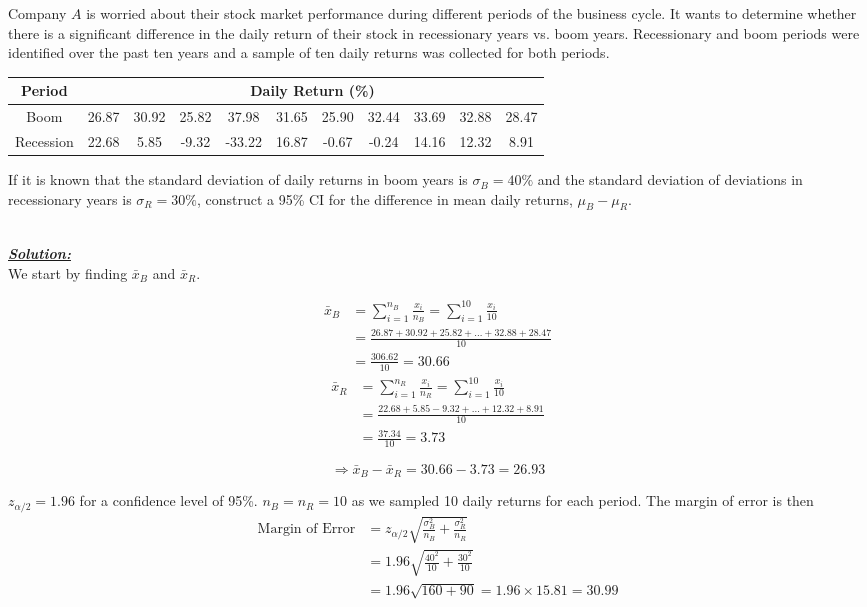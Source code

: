 \begin{example}
Company $A$ is worried about their stock market performance during different periods of the business cycle. It wants to determine whether there is a significant difference in the daily return of their stock in recessionary years vs. boom years. Recessionary and boom periods were identified over the past ten years and a sample of ten daily returns was collected for both periods. 

\begin{center}
\begin{tabular}{c|c|c|c|c|c|c|c|c|c|c}
\def\arraystretch{2}
Period & \multicolumn{10}{c}{Daily Return (\%)} \\ 
\hline
Boom & 26.87& 30.92 &25.82& 37.98& 31.65& 25.90 &32.44 &33.69& 32.88& 28.47 \\ 
\hline 
Recession & 22.68  & 5.85&  -9.32& -33.22&  16.87  &-0.67 & -0.24 & 14.16&  12.32&   8.91
\end{tabular} 
\end{center}

If it is known that the standard deviation of daily returns in boom years is $\sigma_B = 40\%$ and the standard deviation of deviations in recessionary years is $\sigma_R=30\%$, construct a 95\% CI for the difference in mean daily returns, $\mu_B - \mu_R$.


\hfill\\
{\emph{\textbf{\underline{Solution:}}}}\\


We start by finding $\bar{x}_B$ and $\bar{x}_R$. 

\begin{align*}
\bar{x}_B 	&= \sum_{i=1}^{n_B} \frac{x_i}{n_B}=\sum_{i=1}^{10} \frac{x_i}{10} \\
			&= \frac{26.87+30.92+25.82+\hdots+32.88+28.47}{10} \\
			&= \frac{306.62}{10}=30.66
\end{align*}
\begin{align*}
\bar{x}_R	&= \sum_{i=1}^{n_R} \frac{x_i}{n_R}=\sum_{i=1}^{10} \frac{x_i}{10} \\
			&= \frac{22.68+5.85-9.32+\hdots+12.32+8.91}{10}\\
			&= \frac{37.34}{10} = 3.73
\end{align*}

\[ \Rightarrow \bar{x}_B - \bar{x}_R = 30.66-3.73 = 26.93\]


$z_{\alpha/2}=1.96$ for a confidence level of 95\%. $n_B=n_R=10$ as we sampled 10 daily returns for each period. The margin of error is then
\begin{align*}
\text{Margin of Error} 	&= z_{\alpha/2} \sqrt{\frac{\sigma_B^2}{n_B}+\frac{\sigma_R^{2}}{n_R}} \\
						&= 1.96 \sqrt{\frac{40^2}{10}+\frac{30^2}{10}} \\
						&= 1.96 \sqrt{160+90} = 1.96 \times 15.81 = 30.99
\end{align*}


\end{example}
